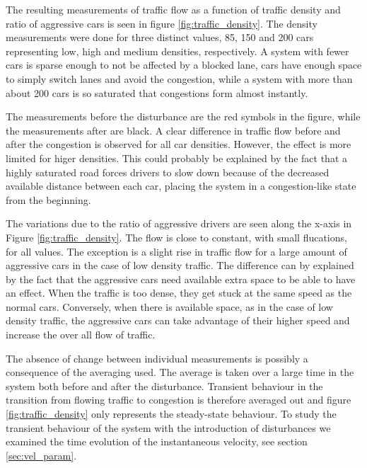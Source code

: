 \documentclass[11pt,a4paper,twocolumn]{article}
\begin{document}
 The resulting measurements of traffic flow as a function of traffic density and ratio of aggressive cars is seen in figure \ref{fig:traffic_density}. The density measurements were done for three distinct values, 85, 150 and 200 cars representing low, high and medium densities, respectively. A system with fewer cars is sparse enough to not be affected by a blocked lane, cars have enough space to simply switch lanes and avoid the congestion, while a system with more than about 200 cars is so saturated that congestions form almost instantly.
 
 The measurements before the disturbance are the red symbols in the figure, while the measurements after are black. A clear difference in traffic flow before and after the congestion is observed for all car densities. However, the effect is more limited for higer densities. This could probably be explained by the fact that a highly saturated road forces drivers to slow down because of the decreased available distance between each car, placing the system in a congestion-like state from the beginning.

 The variations due to the ratio of aggressive drivers are seen along the x-axis in Figure \ref{fig:traffic_density}. The flow is close to constant, with small flucations, for all values. The exception is a slight rise in traffic flow for a large amount of aggressive cars in the case of low density traffic. The difference can by explained by the fact that the aggressive cars need available extra space to be able to have an effect. When the traffic is too dense, they get stuck at the same speed as the normal cars. Conversely, when there is available space, as in the case of low density traffic, the aggressive cars can take advantage of their higher speed and increase the over all flow of traffic.  

 The absence of change between individual measurements is possibly a consequence of the averaging used. The average is taken over a large time in the system both before and after the disturbance. Transient behaviour in the transition from flowing traffic to congestion is therefore averaged out and figure \ref{fig:traffic_density} only represents the steady-state behaviour. To study the transient behaviour of the system with the introduction of disturbances we examined the time evolution of the instantaneous velocity, see section \ref{sec:vel_param}. 
\end{document}
